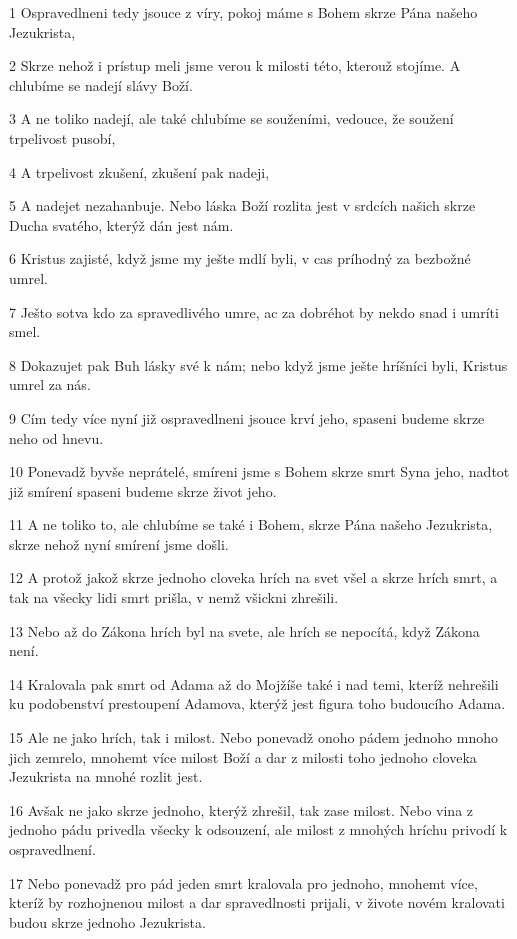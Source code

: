 \par 1 Ospravedlneni tedy jsouce z víry, pokoj máme s Bohem skrze Pána našeho Jezukrista,
\par 2 Skrze nehož i prístup meli jsme verou k milosti této, kterouž stojíme. A chlubíme se nadejí slávy Boží.
\par 3 A ne toliko nadejí, ale také chlubíme se souženími, vedouce, že soužení trpelivost pusobí,
\par 4 A trpelivost zkušení, zkušení pak nadeji,
\par 5 A nadejet nezahanbuje. Nebo láska Boží rozlita jest v srdcích našich skrze Ducha svatého, kterýž dán jest nám.
\par 6 Kristus zajisté, když jsme my ješte mdlí byli, v cas príhodný za bezbožné umrel.
\par 7 Ješto sotva kdo za spravedlivého umre, ac za dobréhot by nekdo snad i umríti smel.
\par 8 Dokazujet pak Buh lásky své k nám; nebo když jsme ješte hríšníci byli, Kristus umrel za nás.
\par 9 Cím tedy více nyní již ospravedlneni jsouce krví jeho, spaseni budeme skrze neho od hnevu.
\par 10 Ponevadž byvše neprátelé, smíreni jsme s Bohem skrze smrt Syna jeho, nadtot již smírení spaseni budeme skrze život jeho.
\par 11 A ne toliko to, ale chlubíme se také i Bohem, skrze Pána našeho Jezukrista, skrze nehož nyní smírení jsme došli.
\par 12 A protož jakož skrze jednoho cloveka hrích na svet všel a skrze hrích smrt, a tak na všecky lidi smrt prišla, v nemž všickni zhrešili.
\par 13 Nebo až do Zákona hrích byl na svete, ale hrích se nepocítá, když Zákona není.
\par 14 Kralovala pak smrt od Adama až do Mojžíše také i nad temi, kteríž nehrešili ku podobenství prestoupení Adamova, kterýž jest figura toho budoucího Adama.
\par 15 Ale ne jako hrích, tak i milost. Nebo ponevadž onoho pádem jednoho mnoho jich zemrelo, mnohemt více milost Boží a dar z milosti toho jednoho cloveka Jezukrista na mnohé rozlit jest.
\par 16 Avšak ne jako skrze jednoho, kterýž zhrešil, tak zase milost. Nebo vina z jednoho pádu privedla všecky k odsouzení, ale milost z mnohých hríchu privodí k ospravedlnení.
\par 17 Nebo ponevadž pro pád jeden smrt kralovala pro jednoho, mnohemt více, kteríž by rozhojnenou milost a dar spravedlnosti prijali, v živote novém kralovati budou skrze jednoho Jezukrista.

